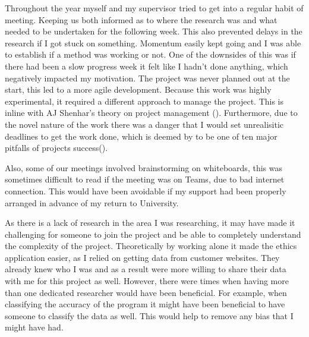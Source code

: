 Throughout the year myself and my supervisor tried to get into a regular habit of meeting. Keeping us both informed as to where the research was and what needed to be undertaken for the following week. This also prevented delays in the research if I got stuck on something. Momentum easily kept going and I was able to establish if a method was working or not. One of the downsides of this was if there had been a slow progress week it felt like I hadn't done anything, which negatively impacted my motivation. The project was never planned out at the start, this led to a more agile development. Because this work was highly experimental, it required a different approach to manage the project. This is inline with AJ Shenhar's theory on project management (\cite{Shenhar1}). Furthermore, due to the novel nature of the work there was a danger that I would set unrealisitic deadlines to get the work done, which is deemed by \citeauthor{GanttPRO} to be one of ten major pitfalls of projects success(\cite{GanttPRO}). 

Also, some of our meetings involved brainstorming on whiteboards, this was sometimes difficult to read if the meeting was on Teams, due to bad internet connection. This would have been avoidable if my support had been properly arranged in advance of my return to University.

As there is a lack of research in the area I was researching, it may have made it challenging for someone to join the project and be able to completely understand the complexity of the project. Theoretically by working alone it made the ethics application easier, as I relied on getting data from customer websites. They already knew who I was and as a result were more willing to share their data with me for this project as well. However, there were times when having more than one dedicated researcher would have been beneficial. For example, when classifying the accuracy of the program it might have been beneficial to have someone to classify the data as well. This would help to remove any bias that I might have had.

